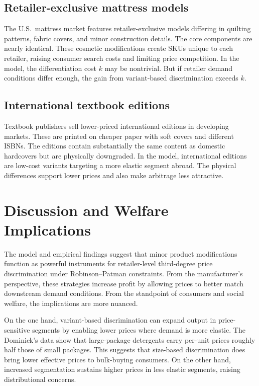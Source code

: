 \documentclass[12pt]{article}
\theoremstyle{definition}
\begin{document}
\subsection{Retailer-exclusive mattress models}

The U.S.\ mattress market features retailer-exclusive models differing in quilting patterns, fabric covers, and minor construction details. The core components are nearly identical.
These cosmetic modifications create SKUs unique to each retailer, raising consumer search costs and limiting price competition.
In the model, the differentiation cost $k$ may be nontrivial. But if retailer demand conditions differ enough, the gain from variant-based discrimination exceeds $k$.

\subsection{International textbook editions}

Textbook publishers sell lower-priced international editions in developing markets. These are printed on cheaper paper with soft covers and different ISBNs.
The editions contain substantially the same content as domestic hardcovers but are physically downgraded.
In the model, international editions are low-cost variants targeting a more elastic segment abroad. The physical differences support lower prices and also make arbitrage less attractive.


\section{Discussion and Welfare Implications}\label{sec:welfare}

The model and empirical findings suggest that minor product modifications function as powerful instruments for retailer-level third-degree price discrimination under Robinson--Patman constraints.
From the manufacturer's perspective, these strategies increase profit by allowing prices to better match downstream demand conditions.
From the standpoint of consumers and social welfare, the implications are more nuanced.

On the one hand, variant-based discrimination can expand output in price-sensitive segments by enabling lower prices where demand is more elastic.
The Dominick's data show that large-package detergents carry per-unit prices roughly half those of small packages. This suggests that size-based discrimination does bring lower effective prices to bulk-buying consumers.
On the other hand, increased segmentation sustains higher prices in less elastic segments, raising distributional concerns.
\end{document}
